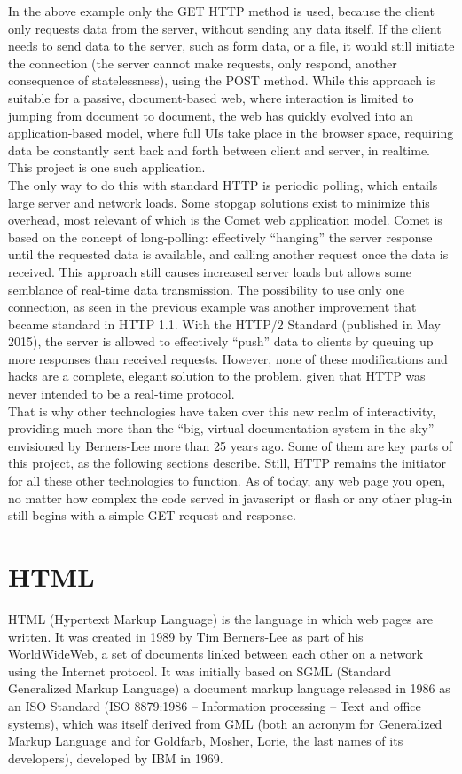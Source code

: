 In the above example only the GET HTTP method is used, because the client only requests data from the server, without
sending any data itself. If the client needs to send data to the server, such as form data, or a file, it would still
initiate the connection (the server cannot make requests, only respond, another consequence of statelessness), using
the POST method. While this approach is suitable for a passive, document-based web, where interaction is limited to
jumping from document to document, the web has quickly evolved into an application-based model, where full UIs take
place in the browser space, requiring data be constantly sent back and forth between client and server, in realtime.
This project is one such application.\\

The only way to do this with standard HTTP is periodic polling, which entails large server and network loads. Some
stopgap solutions exist to minimize this overhead, most relevant of which is the Comet web application model. Comet is
based on the concept of long-polling: effectively ``hanging'' the server response until the requested data is
available, and calling another request once the data is received. This approach  still causes increased server loads
but allows some semblance of real-time data transmission. The possibility to use only one connection, as seen in the
previous example was another improvement that became standard in HTTP 1.1. With the HTTP/2 Standard (published in May
2015), the server is allowed to effectively ``push'' data to clients by queuing up more responses than received
requests. However, none of these modifications and hacks are a complete, elegant solution to the problem, given that
HTTP was never intended to be a real-time protocol.\\

That is why other technologies have taken over this new realm of interactivity, providing much more than the ``big,
virtual documentation system in the sky'' \cite{bernerslee09} envisioned by Berners-Lee more than 25 years ago. Some
of them are key parts of this project, as the following sections describe. Still, HTTP remains the initiator for all
these other technologies to function. As of today, any web page you open, no matter how complex the code served in
javascript or flash or any other plug-in still begins with a simple GET request and response.
\section{HTML} \label{HTML}
HTML (Hypertext Markup Language) is the language in which web pages are written. It was created in 1989 by Tim
Berners-Lee as part of his WorldWideWeb, a set of documents linked between each other on a network using the Internet
protocol. It was initially based on SGML (Standard Generalized Markup Language) a document markup language released in
1986 as an ISO Standard (ISO 8879:1986 -- Information processing -- Text and office systems), which was itself derived
from GML (both an acronym for Generalized Markup Language and for Goldfarb, Mosher, Lorie, the last names of its
developers), developed by IBM in 1969.\\

